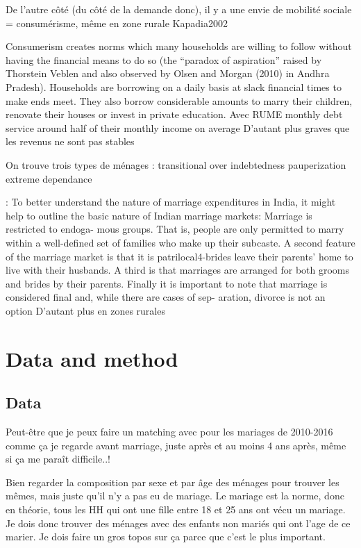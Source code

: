 \documentclass[a4paper, 11pt, onecolumn]{article}
\begin{document}
De l'autre côté (du côté de la demande donc), il y a une envie de mobilité sociale = consumérisme, même en zone rurale Kapadia2002

Consumerism creates norms which many households are
willing to follow without having the financial means to do so (the “paradox of aspiration”
raised by Thorstein Veblen and also observed by Olsen and Morgan (2010) in Andhra
Pradesh). Households are borrowing on a daily basis at slack financial times to make ends
meet. They also borrow considerable amounts to marry their children, renovate their houses
or invest in private education. 
Avec RUME monthly debt service around half of their monthly income on average
D'autant plus graves que les revenus ne sont pas stables

On trouve trois types de ménages : 
transitional over indebtedness
pauperization
extreme dependance




\cite{Bloch2004} : 
To better understand the nature of marriage expenditures in India, it might help to
outline the basic nature of Indian marriage markets: Marriage is restricted to endoga-
mous groups. That is, people are only permitted to marry within a well-defined set of
families who make up their subcaste. A second feature of the marriage market is that
it is patrilocal4-brides leave their parents' home to live with their husbands. A third
is that marriages are arranged for both grooms and brides by their parents. Finally it
is important to note that marriage is considered final and, while there are cases of sep-
aration, divorce is not an option
D'autant plus en zones rurales





\section{Data and method}
\cite{NEEMSISreport}
\cite{NEEMSIS2017}

\subsection{Data}
Peut-être que je peux faire un matching avec pour les mariages de 2010-2016 comme ça je regarde avant marriage, juste après et au moins 4 ans après, même si ça me paraît difficile..!

Bien regarder la composition par sexe et par âge des ménages pour trouver les mêmes, mais juste qu'il n'y a pas eu de mariage.
Le mariage est la norme, donc en théorie, tous les HH qui ont une fille entre 18 et 25 ans ont vécu un mariage.
Je dois donc trouver des ménages avec des enfants non mariés qui ont l'age de ce marier.
Je dois faire un gros topos sur ça parce que c'est le plus important.
\end{document}
